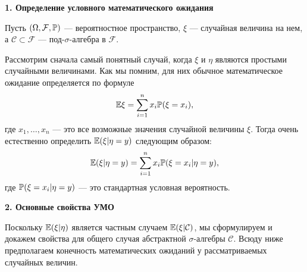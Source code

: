 \textbf{1. Определение условного математического ожидания}

Пусть $(\Omega, \mathcal{F}, \P)$ --- вероятностное пространство, $\xi$ --- случайная величина на нем, а $\mathcal{C} \subset \mathcal{F}$ --- под-$\sigma$-алгебра в $\mathcal{F}$.



Рассмотрим сначала самый понятный случай, когда $\xi$ и $\eta$ являются простыми случайными величинами. Как мы помним, для них обычное математическое ожидание определяется по формуле
$$ \E\xi = \sum_{i=1}^n x_i\P(\xi = x_i), $$
где $x_1, \dots, x_n$ --- это все возможные значения случайной величины $\xi$. Тогда очень естественно определить $\E(\xi|\eta = y)$ следующим образом:
\begin{equation} \label{eq:cme_discrete}
    \E(\xi|\eta = y) = \sum_{i=1}^n x_i\P(\xi = x_i|\eta = y),
\end{equation}
где $\P(\xi = x_i|\eta = y)$ --- это стандартная условная вероятность.


\textbf{2. Основные свойства УМО}

Поскольку $\E(\xi|\eta)$ является частным случаем $\E(\xi|\mathcal{C})$, мы сформулируем и докажем свойства для общего случая абстрактной $\sigma$-алгебры $\mathcal{C}$. Всюду ниже предполагаем конечность математических ожиданий у рассматриваемых случайных величин.

